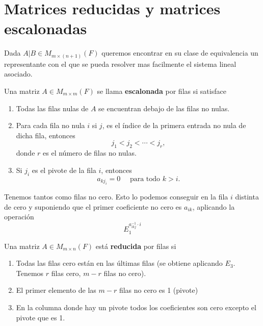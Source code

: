 \documentclass[12pt,a4paper]{book}
\begin{document}
    \section{Matrices reducidas y matrices escalonadas}

    Dada $A|B\in M_{m\times(n+1)}(F)$ queremos encontrar en su clase de equivalencia un representante con el que
    se pueda resolver mas facilmente el sistema lineal asociado.

    \begin{definicion}
        Una matriz $A\in M_{m\times m}(F)$ se llama \textbf{escalonada} por filas si satisface
        \begin{enumerate}
            \item Todas las filas nulas de $A$ se encuentran debajo de las filas no nulas.
            \item Para cada fila no nula $i$ si $j$, es el índice de la primera entrada no nula de dicha fila,
            entonces
            \begin{equation*}
                j_{1}\lt j_{2}\lt\cdots\lt j_{r},
            \end{equation*}
            donde $r$ es el número de filas no nulas.
            \item Si $j_{i}$ es el pivote de la fila $i$, entonces
            \begin{equation*}
                a_{kj_{i}}=0\quad\text{ para todo }k\gt i.
            \end{equation*}
        \end{enumerate}
    \end{definicion}

    Tenemos tantos como filas no cero. Esto lo podemos conseguir en la fila $i$ distinta de cero y suponiendo que
    el primer coeficiente no cero es $a_{ik}$, aplicando la operación
    \begin{equation*}
        E_{1}^{a_{ikj}^{-1}\cdot i}
    \end{equation*}

    \begin{definicion}
        Una matriz $A\in M_{m\times n}(F)$ está \textbf{reducida} por filas si
        \begin{enumerate}
            \item Todas las filas cero están en las últimas filas (se obtiene aplicando $E_{3}$.
            Tenemos $r$ filas cero, $m-r$ filas no cero).
            \item El primer elemento de las $m-r$ filas no cero es 1 (pivote)
            \item En la columna donde hay un pivote todos los coeficientes son cero excepto el pivote que es 1.
        \end{enumerate}
    \end{definicion}
\end{document}
